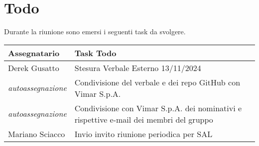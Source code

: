 \section{Todo}
Durante la riunione sono emersi i seguenti task da svolgere.

\begin{center}
  \begin{tabular}{|p{5cm}|p{8cm}|}
    \hline
    \textbf{Assegnatario}       & \textbf{Task Todo} \\ \hline
     Derek Gusatto   &  Stesura Verbale Esterno 13/11/2024\\ \hline
     \textit{autoassegnazione}  & Condivisione del verbale e dei repo GitHub con Vimar S.p.A. \\ \hline
     \textit{autoassegnazione}  & Condivisione con Vimar S.p.A. dei nominativi e rispettive e-mail dei membri del gruppo \\ \hline
     Mariano Sciacco  & Invio invito riunione periodica per SAL \\ \hline
     
  \end{tabular}
\end{center}
